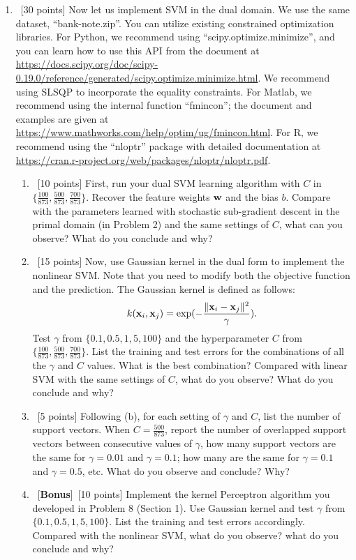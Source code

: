 \documentclass[12pt, fullpage,letterpaper]{article}
\begin{document}
\begin{enumerate}
\item~[30 points] Now let us implement SVM in the dual domain. We use the same dataset, ``bank-note.zip''. You can utilize existing constrained optimization libraries. For Python, we recommend using ``scipy.optimize.minimize'', and you can learn how to use this API from the document at \url{https://docs.scipy.org/doc/scipy-0.19.0/reference/generated/scipy.optimize.minimize.html}. We recommend using SLSQP to incorporate the equality constraints.
For Matlab, we recommend using the internal function ``fmincon''; the document and examples are given at \url{https://www.mathworks.com/help/optim/ug/fmincon.html}.  
For R, we recommend using the ``nloptr'' package with detailed documentation at \url{https://cran.r-project.org/web/packages/nloptr/nloptr.pdf}.

\begin{enumerate}
	\item ~[10 points] First, run your dual SVM learning algorithm with   $C$ in $\{\frac{100}{873}, \frac{500}{873}, \frac{700}{873}\}$. Recover the feature weights ${\bf w}$ and the bias $b$. Compare with the parameters learned with stochastic sub-gradient descent in the primal domain (in Problem 2) and the same settings of $C$, what can you observe? What do you conclude and why?
	
	\item~[15 points] Now, use Gaussian kernel in the dual form to implement the nonlinear SVM. Note that you need to modify both the objective function and the prediction. The Gaussian kernel is defined as follows:
	\[
	k({\bf x}_i, {\bf x}_j) = \exp(-\frac{\|{\bf x}_i - {\bf x}_j\|^2}{\gamma}).
	\]
	Test $\gamma$ from $\{0.1, 0.5, 1,  5, 100\}$ and the hyperparameter $C$ from $\{ \frac{100}{873}, \frac{500}{873},  \frac{700}{873}\}$. List the training and test errors for the combinations of all the $\gamma$ and $C$ values. What is the best combination? Compared with linear SVM with the same settings of $C$, what do you observe? What do you conclude and why?  
	
	\item~[5 points] Following (b), for each setting of $\gamma$ and $C$, list the number of support vectors. When $C = \frac{500}{873}$, report the number of overlapped support vectors between consecutive values of $\gamma$, \ie how many support vectors are the same for $\gamma= 0.01$ and $\gamma = 0.1$; how many are the same for  $\gamma = 0.1$ and $\gamma = 0.5$, etc. What do you observe and conclude? Why?
	
	\item~[\textbf{Bonus}]~[10 points] Implement the kernel Perceptron algorithm you developed in Problem 8 (Section 1). Use Gaussian kernel and test $\gamma$ from $\{ 0.1, 0.5, 1, 5, 100\}$. List the training and test errors accordingly. Compared with the nonlinear SVM, what do you observe? what do you conclude and why?
	
\end{enumerate} 

\end{enumerate}
\end{document}
